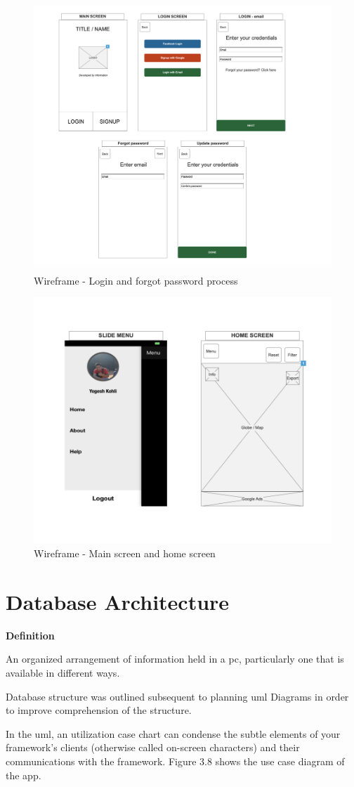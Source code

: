   
  
    \begin{figure}[H]
            \centering
            \includegraphics[width=0.5\linewidth]{figures/ch3/wireframe_2.png}
            \caption{\label{fig:wireframe_2} Wireframe - Login and forgot password process}
    \end{figure}
    
    \begin{figure}[H]
            \centering
            \includegraphics[width=0.5\linewidth]{figures/ch3/wireframe_3.png}
            \caption{\label{fig:wireframe_3} Wireframe - Main screen and home screen}
    \end{figure}


\section{Database Architecture}

\textbf{Definition}

An organized arrangement of information held in a \gls{pc}, particularly one that is available in different ways.


Database structure was outlined subsequent to planning \gls{uml} Diagrams in order to improve comprehension of the structure.

In the \gls{uml}, an utilization case chart can condense the subtle elements of your framework's clients (otherwise called on-screen characters) and their communications with the framework. Figure 3.8 shows the use case diagram of the app.

